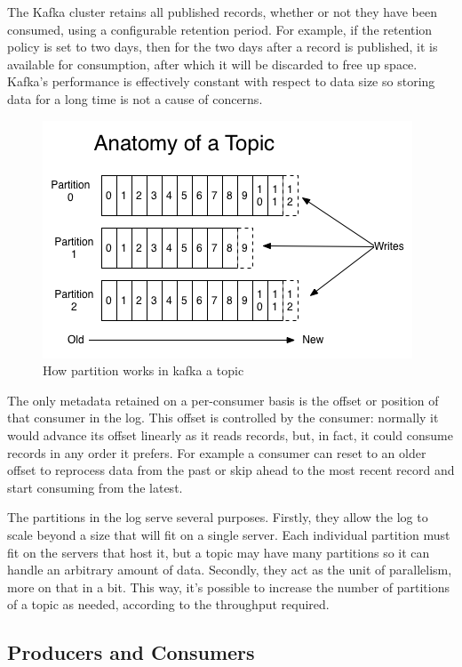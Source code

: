 The Kafka cluster retains all published records, whether or not they have been consumed, using a configurable retention period. For example, if the retention policy is set to two days, then for the two days after a record is published, it is available for consumption, after which it will be discarded to free up space. Kafka's performance is effectively constant with respect to data size so storing data for a long time is not a cause of concerns.


\begin{figure}[h]
    \centering
    \includegraphics[width=0.7\linewidth]{Figures/log_anatomy}
    \caption[How partition works in kafka a topic]{How partition works in kafka a topic}
    \label{fig:loganatomy}
\end{figure}

The only metadata retained on a per-consumer basis is the offset or position of that consumer in the log. This offset is controlled by the consumer: normally it would advance its offset linearly as it reads records, but, in fact, it could consume records in any order it prefers. For example a consumer can reset to an older offset to reprocess data from the past or skip ahead to the most recent record and start consuming from the latest.

The partitions in the log serve several purposes. Firstly, they allow the log to scale beyond a size that will fit on a single server. Each individual partition must fit on the servers that host it, but a topic may have many partitions so it can handle an arbitrary amount of data. Secondly, they act as the unit of parallelism, more on that in a bit. This way, it's possible to increase the number of partitions of a topic as needed, according to the throughput required.

\subsection{Producers and Consumers}

